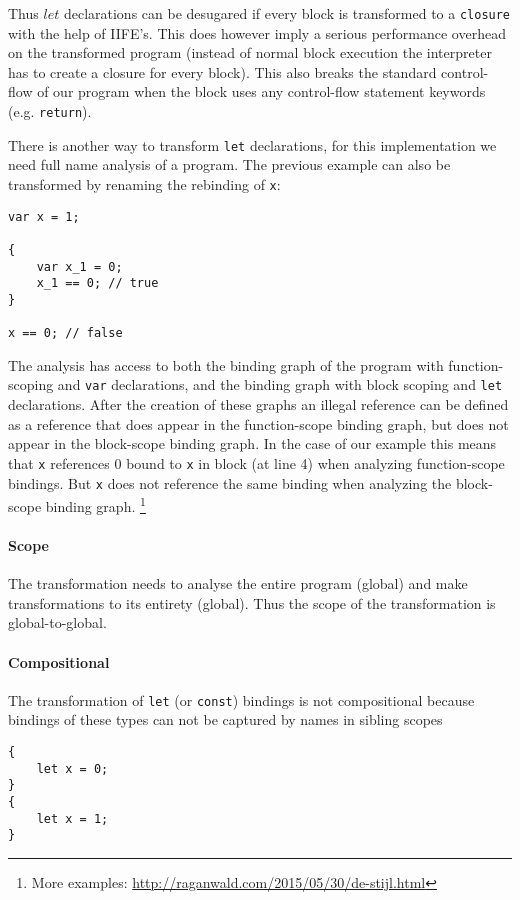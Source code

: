 Thus $let$ declarations can be desugared if every block is transformed to a \lstinline$closure$ with the help of IIFE's. This does however imply a serious performance overhead on the transformed program (instead of normal block execution the interpreter has to create a closure for every block). This also breaks the standard control-flow of our program when the block uses any control-flow statement keywords (e.g. \lstinline$return$).

There is another way to transform \lstinline$let$ declarations, for this implementation we need full name analysis of a program. The previous example can also be transformed by renaming the rebinding of \lstinline$x$:

\begin{lstlisting}
var x = 1;

{
	var x_1 = 0;
	x_1 == 0; // true
}

x == 0; // false
\end{lstlisting}

The analysis has access to both the binding graph of the program with function-scoping and \lstinline$var$ declarations, and the binding graph with block scoping and \lstinline$let$ declarations. After the creation of these graphs an illegal reference can be defined as a reference that does appear in the function-scope binding graph, but does not appear in the block-scope binding graph. In the case of our example this means that \lstinline$x$ references 0 bound to \lstinline$x$ in block (at line 4) when analyzing function-scope bindings. But \lstinline$x$ does not reference the same binding when analyzing the block-scope binding graph. \footnote{More examples: \url{http://raganwald.com/2015/05/30/de-stijl.html}}

\paragraph{Scope}
The transformation needs to analyse the entire program (global) and make transformations to its entirety (global). Thus the scope of the transformation is global-to-global.

\paragraph{Compositional}
The transformation of \lstinline$let$ (or \lstinline$const$) bindings is not compositional because bindings of these types can not be captured by names in sibling scopes

\begin{lstlisting}
{
	let x = 0;
}
{
	let x = 1;
}
\end{lstlisting}

